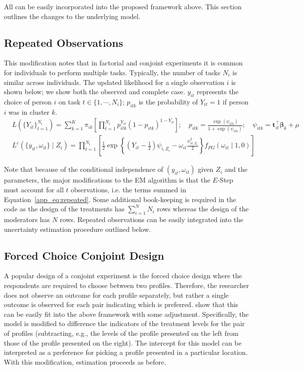 All can be easily incorporated into the proposed framework above. This
section outlines the changes to the underlying model.

\subsection{Repeated Observations}
\label{sec:app_extensions_repeat}

This modification notes that in factorial and conjoint experiments it
is common for individuals to perform multiple tasks. Typically, the
number of tasks $N_i$ is similar across individuals. The updated
likelihood for a single observation $i$ is shown below; we show both
the observed and complete case. $y_{it}$ represents the choice of
person $i$ on task $t \in \{1, \cdots, N_i\}$; $p_{itk}$ is the
probability of $Y_{it} = 1$ if person $i$ was in cluster $k$. 
\begin{align}
  &L\left(\{Y_{it}\}_{t=1}^{N_i}\right) = \sum_{k=1}^K \pi_{ik} \left[\prod_{t=1}^{N_i} p_{itk}^{Y_{it}} (1-p_{itk})^{1-Y_{it}} \right]; \quad p_{itk} = \frac{\exp(\psi_{itk})}{1+\exp(\psi_{itk})}; \quad \psi_{itk} = \bm{t}_{it}^\top\bm{\beta}_k + \mu 
\label{app_eq:repeated} \\
  &L^c(\{y_{it}, \omega_{it}\} \mid Z_i) = \prod_{t=1}^{N_i}
    \left[\frac{1}{2} \exp\left\{\left(Y_{it} - \frac{1}{2}\right)
    \psi_{i, Z_i} - \omega_{it} \frac{\psi_{it,Z_i}^2}{2}\right\}
    f_{PG}(\omega_{it} \mid 1, 0) \right]  
\end{align}

Note that because of the conditional independence of
$(y_{it}, \omega_{it})$ given $Z_i$ and the parameters, the major
modifications to the EM algorithm is that the $E$-Step must account
for all $t$ observations, i.e. the terms summed in
Equation~\eqref{app_eq:repeated}. Some additional book-keeping is
required in the code as the design of the treatments has
$\sum_{i=1}^N N_i$ rows whereas the design of the moderators has $N$
rows. Repeated observations can be easily integrated into the
uncertainty estimation procedure outlined below.

\subsection{Forced Choice Conjoint Design}
\label{sec:app_extensions_forced}

A popular design of a conjoint experiment is the forced choice design
where the respondents are required to choose between two profiles.
Therefore, the researcher does not observe an outcome for each profile
separately, but rather a single outcome is observed for each pair
indicating which is preferred. \cite{egam:imai:19} show that this can
be easily fit into the above framework with some adjustment.
Specifically, the model is modified to difference the indicators of
the treatment levels for the pair of profiles (subtracting, e.g., the
levels of the profile presented on the left from those of the profile
presented on the right). The intercept for this model can be
interpreted as a preference for picking a profile presented in a
particular location.  With this modification, estimation proceeds as
before.

